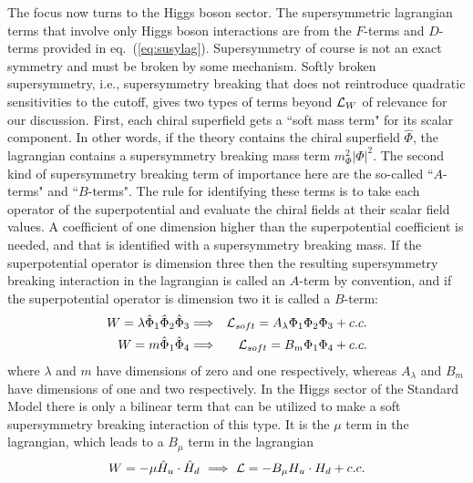 \documentclass[12pt]{article}
\def\beq{\begin{eqnarray}}
\def\eeq{\end{eqnarray}}
\def\bea{\begin{eqnarray}}
\def\eea{\end{eqnarray}}
\def\eq#1{eq.~(\ref{#1})}
\begin{document}
The focus now turns to the Higgs boson sector. The supersymmetric lagrangian terms that involve only Higgs boson interactions are from the $F$-terms and $D$-terms provided in \eq{eq:susylag}. Supersymmetry of course is not an exact symmetry and must be broken by some mechanism. Softly broken supersymmetry, i.e., supersymmetry breaking that does not reintroduce quadratic sensitivities to the cutoff, gives two types of terms beyond ${\cal L}_W$  of relevance for our discussion. First, each chiral superfield gets a ``soft mass term" for its scalar component. In other words,  if the theory contains the chiral superfield $\hat \Phi$, the lagrangian contains a supersymmetry breaking mass term $m_\Phi^2|\Phi|^2$.
The second kind of supersymmetry breaking term of importance here are the so-called ``$A$-terms" and ``$B$-terms". The rule for identifying these terms is to take each operator of the superpotential and evaluate the chiral fields at their scalar field values.  A coefficient of one dimension higher than the superpotential coefficient is needed, and that is identified with a supersymmetry breaking mass. If the superpotential operator is dimension three then the resulting supersymmetry breaking interaction in the lagrangian is called an $A$-term by convention, and if the superpotential operator is dimension two it is called a $B$-term:
\bea
W=\lambda \hat \Phi_1\hat\Phi_2\hat\Phi_3 &\Longrightarrow & {\cal L}_{soft}=A_\lambda \Phi_1\Phi_2\Phi_3 +c.c. \\
W=m \hat \Phi_1\hat\Phi_4& \Longrightarrow &{\cal L}_{soft}=B_m \Phi_1\Phi_4+c.c.
\eea
where $\lambda$ and $m$ have dimensions of zero and one respectively, whereas $A_\lambda$ and $B_m$ have dimensions of one and two respectively.
In the Higgs sector of the Standard Model there is only a bilinear term that can be utilized to make a soft supersymmetry breaking interaction of this type. It is the $\mu$ term in the lagrangian, which leads to a $B_\mu$ term in the lagrangian
\beq
W=-\mu  \hat H_u\cdot \hat H_d~\Longrightarrow~ {\cal L}=-B_\mu H_u\cdot H_d+c.c.
\eeq
\end{document}
